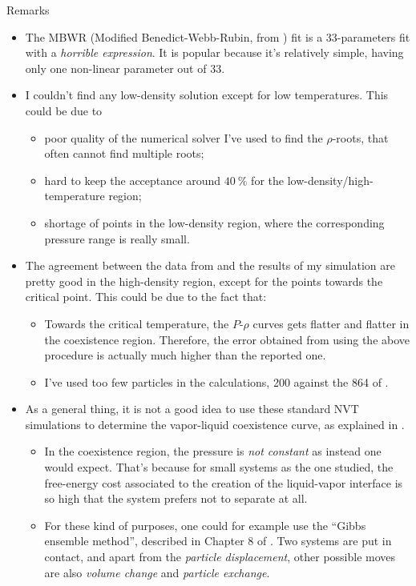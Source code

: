 \documentclass[10pt, compress, protectframetitle, handout]{beamer}
\begin{document}
\begin{frame}[allowframebreaks]{Remarks}

	\begin{itemize}
		\item The MBWR (Modified Benedict-Webb-Rubin, from \cite{Nicolas1979}) fit is a 33-parameters fit with a \emph{horrible expression}. It is popular because it's relatively simple, having only one non-linear parameter out of 33.
		\item I couldn't find any low-density solution except for low temperatures. This could be due to
		\begin{itemize}
			\item poor quality of the numerical solver I've used to find the $\rho$-roots, that often cannot find multiple roots;
			\item hard to keep the acceptance around $\SI{40}{\percent}$ for the low-density/high-temperature region;
			\item shortage of points in the low-density region, where the corresponding pressure range is really small.
		\end{itemize}
		\item The agreement between the data from \cite{Johnson1993} and the results of my simulation are pretty good in the high-density region, except for the points towards the critical point. This could be due to the fact that:
		\begin{itemize}
			\item Towards the critical temperature, the $P$-$\rho$ curves gets flatter and flatter in the coexistence region. Therefore, the error obtained from using the above procedure is actually much higher than the reported one.
			\item I've used too few particles in the calculations, 200 against the 864 of \cite{Johnson1993}.
		\end{itemize}
		\item As a general thing, it is not a good idea to use these standard NVT simulations to determine the vapor-liquid coexistence curve, as explained in \cite{Frenkel2002}.
		\begin{itemize}
			\item In the coexistence region, the pressure is \emph{not constant} as instead one would expect. That's because for small systems as the one studied, the free-energy cost associated to the creation of the liquid-vapor interface is so high that the system prefers not to separate at all.
			\item For these kind of purposes, one could for example use the ``Gibbs ensemble method'', described in Chapter 8 of \cite{Frenkel2002}. Two systems are put in contact, and apart from the \emph{particle displacement}, other possible moves are also \emph{volume change} and \emph{particle exchange}.
		\end{itemize}
	\end{itemize}
	

\end{frame}
\end{document}
